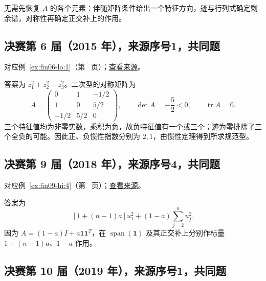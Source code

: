 \documentclass[12pt,fontset=fandol]{ctexart}
\begin{document}
\begin{remark}[方法与条件]

无需先恢复 $A$ 的各个元素：伴随矩阵条件给出一个特征方向，迹与行列式确定剩余谱，对称性再确定正交补上的作用。

\end{remark}

\subsection{决赛第 6 届（2015 年），来源序号1，共同题}\label{ans:fin06-lo:1}\label{pr:fin06-lo:1}

对应例~\ref{ex:fin06-lo:1}（第~\pageref{ex:fin06-lo:1} 页）；\href{https://github.com/lzxcr/cmc-mathematics/blob/64916fa1fdbc3e444a652eca204d5669058ee321/src/problems/finals/06/01.md}{查看来源}。

\begin{solve}

答案为 $z_1^2+z_2^2-z_3^2$。二次型的对称矩阵为
\[
A=\begin{pmatrix}0&1&-1/2\\1&0&5/2\\-1/2&5/2&0\end{pmatrix},
\qquad \det A=-\frac52<0,\qquad\operatorname{tr}A=0.
\]
三个特征值均为非零实数，乘积为负，故负特征值有一个或三个；迹为零排除了三个全负的可能。因此正、负惯性指数分别为 $2,1$，由惯性定理得到所求规范型。

\end{solve}

\subsection{决赛第 9 届（2018 年），来源序号4，共同题}\label{ans:fin09-hi:4}\label{pr:fin09-hi:4}

对应例~\ref{ex:fin09-hi:4}（第~\pageref{ex:fin09-hi:4} 页）；\href{https://github.com/lzxcr/cmc-mathematics/blob/64916fa1fdbc3e444a652eca204d5669058ee321/src/problems/finals/09/04.md}{查看来源}。

\begin{solve}

答案为
\[
[1+(n-1)a]u_1^2+(1-a)\sum_{j=2}^nu_j^2.
\]
因为 $A=(1-a)I+a\mathbf1\mathbf1^T$，在 $\operatorname{span}(\mathbf1)$ 及其正交补上分别作标量 $1+(n-1)a$、$1-a$ 作用。

\end{solve}

\subsection{决赛第 10 届（2019 年），来源序号1，共同题}\label{ans:fin10-hi:1}\label{pr:fin10-hi:1}
\end{document}
